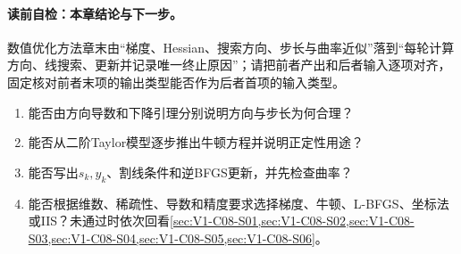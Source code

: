 \label{struct:V1-C08-CH36}
\paragraph{读前自检：本章结论与下一步。}数值优化方法章末由“梯度、Hessian、搜索方向、步长与曲率近似”落到“每轮计算方向、线搜索、更新并记录唯一终止原因”；请把前者产出和后者输入逐项对齐，固定核对前者末项的输出类型能否作为后者首项的输入类型。\par

\begin{SLCompactClosure}

\label{struct:V1-C08-CH37}
\begin{selfcheckbox}
\begin{enumerate}[leftmargin=2.2em]
  \item 能否由方向导数和下降引理分别说明方向与步长为何合理？
  \item 能否从二阶Taylor模型逐步推出牛顿方程并说明正定性用途？
  \item 能否写出$s_k,y_k$、割线条件和逆BFGS更新，并先检查曲率？
  \item 能否根据维数、稀疏性、导数和精度要求选择梯度、牛顿、L-BFGS、坐标法或IIS？未通过时依次回看\cref{sec:V1-C08-S01,sec:V1-C08-S02,sec:V1-C08-S03,sec:V1-C08-S04,sec:V1-C08-S05,sec:V1-C08-S06}。
\end{enumerate}
\end{selfcheckbox}
\end{SLCompactClosure}

